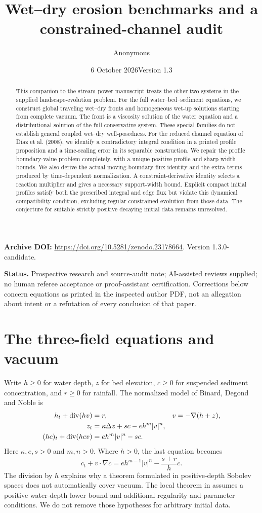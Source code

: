 \documentclass[11pt,a4paper]{article}
\title{Wet--dry erosion benchmarks and a constrained-channel audit}
\author{Anonymous}
\date{6 October 2026\quad Version 1.3}
\theoremstyle{remark}\newtheorem{remark}[theorem]{Remark}
\begin{document}
\maketitle
\noindent\textbf{Archive DOI:} \url{https://doi.org/10.5281/zenodo.23178664}. Version 1.3.0-candidate.

\begin{abstract}
This companion to the stream-power manuscript treats the other two systems in the supplied landscape-evolution problem. For the full water--bed--sediment equations, we construct global traveling wet--dry fronts and homogeneous wet-up solutions starting from complete vacuum. The front is a viscosity solution of the water equation and a distributional solution of the full conservative system. These special families do not establish general coupled wet--dry well-posedness. For the reduced channel equation of D\'iaz et al. (2008), we identify a contradictory integral condition in a printed profile proposition and a time-scaling error in its separable construction. We repair the profile boundary-value problem completely, with a unique positive profile and sharp width bounds. We also derive the actual moving-boundary flux identity and the extra terms produced by time-dependent normalization. A constraint-derivative identity selects a reaction multiplier and gives a necessary support-width bound. Explicit compact initial profiles satisfy both the prescribed integral and edge flux but violate this dynamical compatibility condition, excluding regular constrained evolution from those data. The conjecture for suitable strictly positive decaying initial data remains unresolved.
\end{abstract}
\noindent\textbf{Status.} Prospective research and source-audit note; AI-assisted reviews supplied; no human referee acceptance or proof-assistant certification. Corrections below concern equations as printed in the inspected author PDF, not an allegation about intent or a refutation of every conclusion of that paper.

\section{The three-field equations and vacuum}
Write $h\geq0$ for water depth, $z$ for bed elevation, $c\geq0$ for suspended sediment concentration, and $r\geq0$ for rainfall. The normalized model of Binard, Degond and Noble \cite{BDN} is
\begin{align}
 h_t+\operatorname{div}(hv)&=r, &v&=-\nabla(h+z),\label{eq:water}\\
 z_t&=\kappa\Delta z+sc-eh^m|v|^n,\label{eq:bed}\\
 (hc)_t+\operatorname{div}(hcv)&=eh^m|v|^n-sc.\label{eq:sediment}
\end{align}
Here $\kappa,e,s>0$ and $m,n>0$. Where $h>0$, the last equation becomes
\[
 c_t+v\cdot\nabla c=e h^{m-1}|v|^n-\frac{s+r}{h}c.
\]
The division by $h$ explains why a theorem formulated in positive-depth Sobolev spaces does not automatically cover vacuum. The local theorem in \cite{BDN} assumes a positive water-depth lower bound and additional regularity and parameter conditions. We do not remove those hypotheses for arbitrary initial data.
\end{document}
